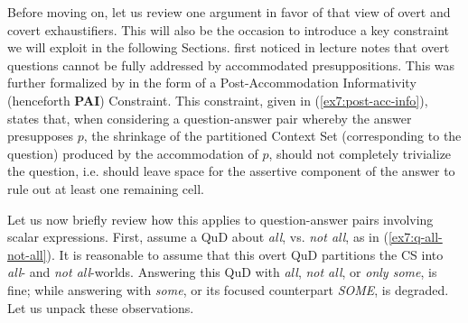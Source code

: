 Before moving on, let us review one argument in favor of that view of overt and covert exhaustifiers. This will also be the occasion to introduce a key constraint we will exploit in the following Sections. \textcite{Heim2015} first noticed in lecture notes that overt questions cannot be fully addressed by accommodated presuppositions. This was further formalized by \textcite{Doron2024} in the form of a Post-Accommodation Informativity (henceforth \textbf{PAI}) Constraint. This constraint, given in (\ref{ex7:post-acc-info}), states that, when considering a question-answer pair whereby the answer presupposes $p$, the shrinkage of the partitioned Context Set (corresponding to the question) produced by the accommodation of $p$, should not completely trivialize the question, i.e. should leave space for the assertive component of the answer to rule out at least one remaining cell.

\begin{exe}
	\label{ex7:post-acc-info}
\end{exe}

Let us now briefly review how this applies to question-answer pairs involving scalar expressions. First, assume a QuD about \textit{all}, vs. \textit{not all}, as in (\ref{ex7:q-all-not-all}). It is reasonable to assume that this overt QuD partitions the CS into \textit{all}- and \textit{not all}-worlds. Answering this QuD with \textit{all}, \textit{not all}, or \textit{only some}, is fine; while answering with \textit{some}, or its focused counterpart \textit{SOME}, is degraded. Let us unpack these observations.

\begin{exe}
	\label{ex7:q-all-not-all}
	\begin{xlist}
	\end{xlist}
\end{exe}

